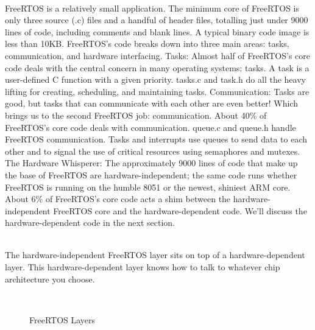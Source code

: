 \begin{description}
\os{\newpage}



\item[{\rot\bf Architecture}]~\\[-3ex]
\bi
\ite FreeRTOS is a relatively small application. The minimum core of FreeRTOS is only three source (.c) files and a handful of header files, totalling just under 9000 lines of code, including comments and blank lines. A typical binary code image is less than 10KB.
\ite
\ite FreeRTOS's code breaks down into three main areas: tasks, communication, and hardware interfacing.
\ite
\ite Tasks: Almost half of FreeRTOS's core code deals with the central concern in many operating systems: tasks. A task is a user-defined C function with a given priority. tasks.c and task.h do all the heavy lifting for creating, scheduling, and maintaining tasks.
\ite Communication: Tasks are good, but tasks that can communicate with each other are even better! Which brings us to the second FreeRTOS job: communication. About 40\% of FreeRTOS's core code deals with communication. queue.c and queue.h handle FreeRTOS communication. Tasks and interrupts use queues to send data to each other and to signal the use of critical resources using semaphores and mutexes.
\ite The Hardware Whisperer: The approximately 9000 lines of code that make up the base of FreeRTOS are hardware-independent; the same code runs whether FreeRTOS is running on the humble 8051 or the newest, shiniest ARM core. About 6\% of FreeRTOS's core code acts a shim between the hardware-independent FreeRTOS core and the hardware-dependent code. We'll discuss the hardware-dependent code in the next section.
\ei

\os{\newpage}



\item[{\rot\bf Hardware Considerations}]~\\[-3ex]
\bi
\ite The hardware-independent FreeRTOS layer sits on top of a hardware-dependent layer. This hardware-dependent layer knows how to talk to whatever chip architecture you choose.
\ei
\begin{figure}[!hbtp]
     \begin{center}
	  \\
	  \caption{FreeRTOS Layers}
     \end{center}
\end{figure}

\os{\newpage}



\end{description}
